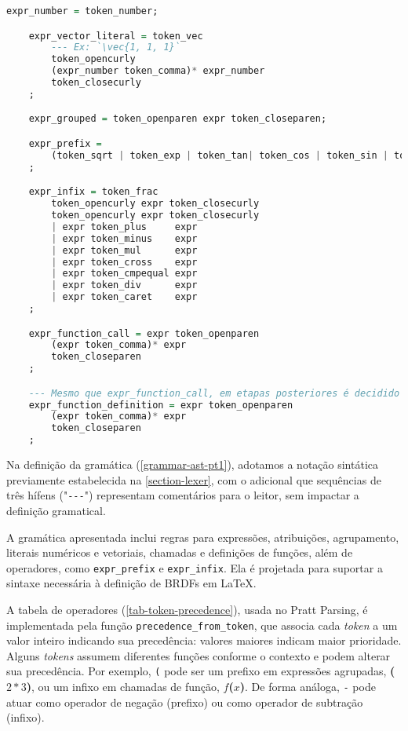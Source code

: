 \begin{codigo}[H]
        \caption{\small Gramática para \texttt{EquantionLang} parte 2.}
        \label{grammar-ast-pt2}
\begin{lstlisting}[language=haskell, basicstyle=\ttfamily\footnotesize,numbers=none, inputencoding=utf8]
    expr_number = token_number;

    expr_vector_literal = token_vec
        --- Ex: `\vec{1, 1, 1}`
        token_opencurly
        (expr_number token_comma)* expr_number
        token_closecurly
    ;

    expr_grouped = token_openparen expr token_closeparen;

    expr_prefix =
        (token_sqrt | token_exp | token_tan| token_cos | token_sin | token_arctan | token_arccos | token_arcsin | token_minus | token_plus) expr
    ;

    expr_infix = token_frac
        token_opencurly expr token_closecurly
        token_opencurly expr token_closecurly
        | expr token_plus     expr
        | expr token_minus    expr
        | expr token_mul      expr
        | expr token_cross    expr
        | expr token_cmpequal expr
        | expr token_div      expr
        | expr token_caret    expr
    ;

    expr_function_call = expr token_openparen
        (expr token_comma)* expr
        token_closeparen
    ;

    --- Mesmo que expr_function_call, em etapas posteriores é decidido qual tipo realmente é.
    expr_function_definition = expr token_openparen
        (expr token_comma)* expr
        token_closeparen
    ;
\end{lstlisting}
\end{codigo}

Na definição da gramática (\autoref{grammar-ast-pt1}), adotamos a notação sintática previamente estabelecida na \autoref{section-lexer}, com o adicional que sequências de três hífens ("\verb"---"") representam comentários para o leitor, sem impactar a definição gramatical.

A gramática apresentada inclui regras para expressões, atribuições, agrupamento, literais numéricos e vetoriais, chamadas e definições de funções, além de operadores, como \verb"expr_prefix" e \verb"expr_infix". Ela é projetada para suportar a sintaxe necessária à definição de BRDFs em \LaTeX{}.



A tabela de operadores (\autoref{tab-token-precedence}), usada no Pratt Parsing, é implementada pela função \texttt{precedence\_from\_token}, que associa cada \textit{token} a um valor inteiro indicando sua precedência: valores maiores indicam maior prioridade. Alguns \textit{tokens} assumem diferentes funções conforme o contexto e podem alterar sua precedência. Por exemplo, \texttt{(} pode ser um prefixo em expressões agrupadas, \textbf{(}$2*3$\textbf{)}, ou um infixo em chamadas de função, $f$\textbf{(}$x$\textbf{)}. De forma análoga, \texttt{-} pode atuar como operador de negação (prefixo) ou como operador de subtração (infixo). 


